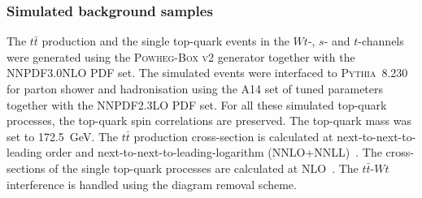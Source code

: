  
 
\subsubsection{Simulated background samples}
The $t\bar{t}$ production and the single top-quark events 
in the $Wt$-, $s$- and $t$-channels
were generated using the \textsc{Powheg-Box v2} generator 
together with the \textsc{NNPDF3.0NLO} PDF set.
The simulated events were interfaced to \textsc{Pythia~8.230} 
for parton shower and hadronisation
using the A14 set of tuned parameters 
together with the \textsc{NNPDF2.3LO} PDF set.
For all these simulated top-quark processes, 
the top-quark spin correlations are preserved.
The top-quark mass was set to 172.5~GeV.
The $t\bar{t}$ production cross-section is calculated
at next-to-next-to-leading order 
and next-to-next-to-leading-logarithm 
(NNLO+NNLL)~\cite{Czakon:2011xx}.
The cross-sections of the single top-quark processes are calculated at
NLO~\cite{stop_sch_Xsec,stop_tch_Xsec,Kidonakis:2010ux}.
The $t\bar{t}$-$Wt$ interference is handled using the diagram removal scheme.



